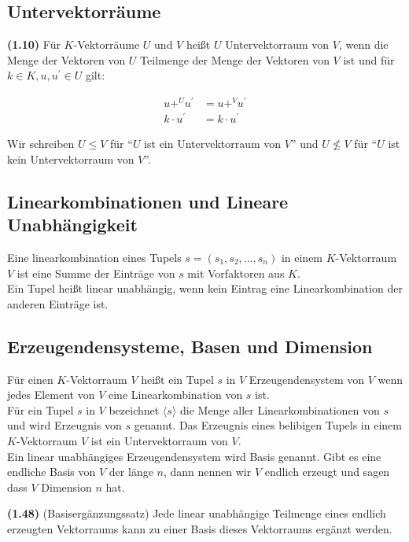 \documentclass[11pt]{scrartcl}
\newlength{\hangwidth}
\newcommand{\skript}[1]{\settowidth{\hangwidth}{\textbf{(#1)} }\hangpara{\hangwidth}{1}\textbf{(#1)} }%
\begin{document}
\subsection{Untervektorräume}

\skript{1.10} Für $K$-Vektorräume $U$ und $V$ heißt $U$ Untervektorraum von $V$, wenn die Menge der Vektoren von $U$ Teilmenge der Menge der Vektoren von $V$ ist und für $k \in K, u,u^\prime \in U$ gilt:

\begin{align*}
	u {+}^{U} u^\prime &= u {+}^{V} u^\prime	\\
	k \cdot u^\prime &= k \cdot u^\prime
\end{align*}

Wir schreiben $U \leq V$ für ``$U$ ist ein Untervektorraum von $V$'' und $U \nleq V$ für ``$U$ ist kein Untervektorraum von $V$''.

\subsection{Linearkombinationen und Lineare Unabhängigkeit}

Eine linearkombination eines Tupels $s = (s_1,s_2, \ldots, s_n)$ in einem $K$-Vektorraum $V$ ist eine Summe der Einträge von $s$ mit Vorfaktoren aus $K$.	\\
Ein Tupel heißt linear unabhängig, wenn kein Eintrag eine Linearkombination der anderen Einträge ist.

\subsection{Erzeugendensysteme, Basen und Dimension}

Für einen $K$-Vektorraum $V$ heißt ein Tupel $s$ in $V$ Erzeugendensystem von $V$ wenn jedes Element von $V$ eine Linearkombination von $s$ ist.	\\
Für ein Tupel $s$ in $V$ bezeichnet $\langle s \rangle$ die Menge aller Linearkombinationen von $s$ und wird Erzeugnis von $s$ genannt. Das Erzeugnis eines belibigen Tupels in einem $K$-Vektorraum $V$ ist ein Untervektorraum von $V$.	\\
Ein linear unabhängiges Erzeugendensystem wird Basis genannt. Gibt es eine endliche Basis von $V$ der länge $n$, dann nennen wir $V$ endlich erzeugt und sagen dass $V$ Dimension $n$ hat.

\skript{1.48} (Basisergänzungssatz) Jede linear unabhängige Teilmenge eines endlich erzeugten Vektorraums kann zu einer Basis dieses Vektorraums ergänzt werden.
\end{document}
